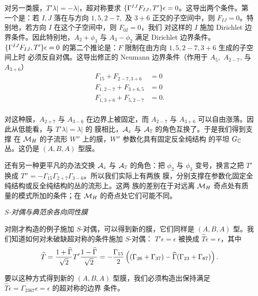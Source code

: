 对另一类膜，$T'\lambda|=-\lambda|$，超对称要求
$\{\G^{IJ}F_{IJ},T'\}\epsilon=0$。这导出两个条件。第一个是：若
$I,J$ 落在与方向 $1,5,2-7,$ 及 $3+6$ 正交的子空间中，则
$F_{IJ}=0$。特别地，若方向 $I$ 在这个子空间中，则 $F_{0I}=0$，我们
对这样的 $I$ 施加 Dirichlet 边界条件。因此特别地，$A_2+\phi_3$ 与
$A_3-\phi_2$ 满足 Dirichlet 边界条件。$\{\G^{IJ}F_{IJ},T'\}\epsilon=0$
的第二个推论是：$F$ 限制在由方向 $1,5,2-7,3+6$ 生成的子空间上时
必须反自对偶。这导出修正的 Neumann 边界条件（作用于 $A_5,$
$A_{2-7}$, 与 $A_{3+6}$） %
\setcounter{equation}{28}
\begin{equation}\label{eq:nono}
\begin{aligned}
F_{15}+F_{2-7,3+6}&=0\\ F_{1,2-7}+F_{3+6,5} & =0\\
F_{1,3+6}+F_{5,2-7}&=0.\\\end{aligned}
\end{equation}

对这种膜，$A_{2+7}$ 与 $A_{3-6}$ 在边界上被固定，而 $A_{2-7}$ 与
$A_{3+6}$ 可以自由涨落。因此从低能看，与 $T'\lambda|=\lambda|$ 的
膜相比，$\CA_z$ 与 $\CA_{\bar z}$ 的角色互换了。于是我们得到支撑
在 $\MH$ 的子流形 $W''$ 上的膜，$W''$ 参数化具有固定反全纯结构
的平坦 $G_{\Bbb{C}}$ 丛。这仍是 $(A,B,A)$ 型膜。

还有另一种更平凡的办法交换 $\CA_z$ 与 $\CA_{\bar z}$ 的角色：把
$\phi_2$ 与 $\phi_3$ 变号，换言之把 $T'$ 换成
$T''=-\Gamma_{15}\Gamma_{2+7}\Gamma_{3-6}$。所以我们实际上有两族
膜，分别支撑在参数化固定全纯结构或反全纯结构的丛的流形上。这两
族的差别在于对远离 $\MH$ 奇点处有质量的模式所加的条件；在 $\MH$
的奇点处它们可能不同。

\par\medskip\emph{$S$-对偶与典范余各向同性膜}

对刚才构造的例子施加 $S$-对偶，可以得到新的膜，它们同样是
$(A,B,A)$ 型。我们知道如何对未破缺超对称的条件施加 $S$-对偶：
$T'\epsilon=\epsilon$ 被换成 $\hat T\epsilon=\epsilon$，其中 %
\setcounter{equation}{29}
\begin{equation}\label{eq:nofo}
\hat T ={1+\HG\over \sqrt
2}T'{1-\HG\over \sqrt 2}=-{\Gamma_{15}\over
2}\left((\Gamma_{26}+\Gamma_{37})-\HG(\Gamma_{23}+\Gamma_{67})\right).
\end{equation}

要以这种方式得到新的 $(A,B,A)$ 型膜，我们必须构造出保持满足
$\hat T\epsilon=\Gamma_{2367}\epsilon=\epsilon$ 的超对称的边界
条件。

